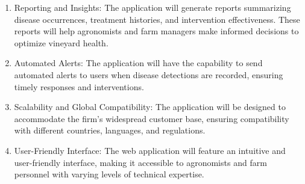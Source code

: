 \begin{enumerate}
    \item Reporting and Insights: The application will generate reports summarizing disease occurrences, treatment histories, and intervention effectiveness. These reports will help agronomists and farm managers make informed decisions to optimize vineyard health.

    \item Automated Alerts: The application will have the capability to send automated alerts to users when disease detections are recorded, ensuring timely responses and interventions.

    \item Scalability and Global Compatibility: The application will be designed to accommodate the firm's widespread customer base, ensuring compatibility with different countries, languages, and regulations.

    \item User-Friendly Interface: The web application will feature an intuitive and user-friendly interface, making it accessible to agronomists and farm personnel with varying levels of technical expertise.
\end{enumerate}

